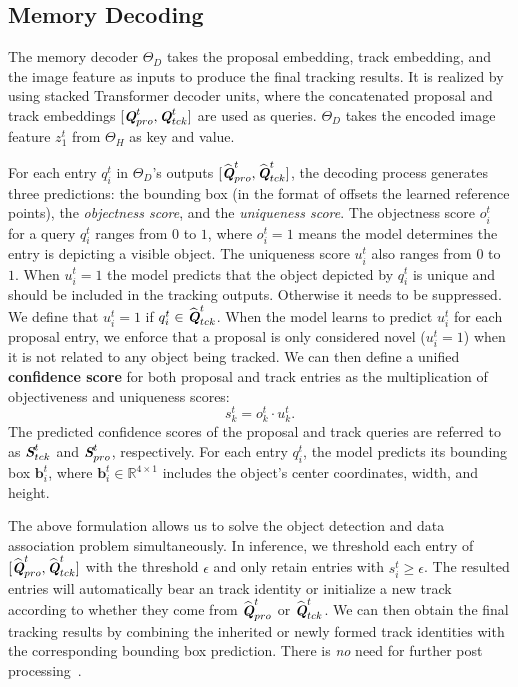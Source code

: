 \subsection{Memory Decoding}
\label{sec:method:theta_D}

The memory decoder $\Theta_D$ takes the proposal embedding, track embedding, and the image feature as inputs to produce the final tracking results. 
It is realized by using stacked Transformer decoder units, where the concatenated proposal and track embeddings $[\textbf{\em Q}^t_{pro}, \textbf{\em Q}^t_{tck}]$ are used as queries.
$\Theta_D$ takes the encoded image feature $z_1^t$ from $\Theta_H$ as key and value.

For each entry $q_i^t$ in $\Theta_D$'s outputs $[\widehat{\textbf{\em Q}}^t_{pro}, \widehat{\textbf{\em Q}}^t_{tck}]$, the decoding process generates three predictions: the bounding box (in the format of offsets \wrt the learned reference points), the \emph{objectness score}, and the \emph{uniqueness score}.
The objectness score $o_{i}^t$ for a query $q_i^t$ ranges from $0$ to $1$, where $o_{i}^t=1$ means the model determines the entry is depicting a visible object.
The uniqueness score $u_i^t$ also ranges from $0$ to $1$. When $u_i^t=1$ the model predicts that the object depicted by $q_i^t$ is unique and should be included in the tracking outputs. Otherwise it needs to be suppressed. We define that $u_i^t=1$ if $q_i^t\in \widehat{\textbf{\em Q}}^t_{tck} $. When the model learns to predict $u_i^t$ for each proposal entry, we enforce that a proposal is only considered novel ($u_i^t=1$) when it is not related to any object being tracked. 
We can then define a unified \textbf{confidence score} for both proposal and track entries as the multiplication of objectiveness and uniqueness scores:
%
\vspace{-1.0mm}
\begin{equation}
s_k^t = 
    o_k^t \cdot u_k^t.
\label{eq:score}
\end{equation}
\vspace{-1.0mm}
%
The predicted confidence scores of the proposal and track queries are referred to as $\textbf{\em S}^t_{tck}$ and $\textbf{\em S}^t_{pro}$, respectively. 
For each entry $q_i^t$, the model predicts its bounding box $\mathbf{b}_i^t$, where $\mathbf{b}_i^t \in \mathbb{R}^{4 \times 1}$ includes the object's center coordinates, width, and height. 

The above formulation allows us to solve the object detection and data association problem simultaneously.
In inference, we threshold each entry of $[\widehat{\textbf{\em Q}}^t_{pro}, \widehat{\textbf{\em Q}}^t_{tck}]$ with the threshold $\epsilon$ and only retain entries with $s_i^t \ge \epsilon$. The resulted entries will automatically bear an track identity or initialize a new track according to whether they come from  $\widehat{\textbf{\em Q}}^t_{pro}$ or $\widehat{\textbf{\em Q}}^t_{tck}$.
We can then obtain the final tracking results by combining the inherited or newly formed track identities with the corresponding bounding box prediction. There is \emph{no} need for further post processing~\cite{wojke2017simple,bergmann2019tracking,zhang2020fair}. 

